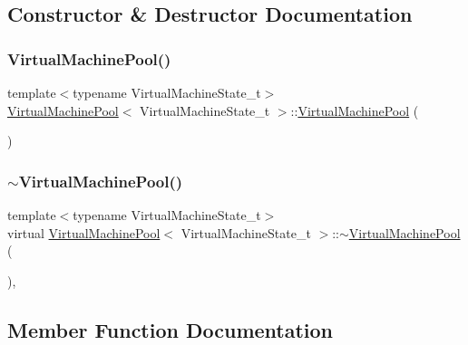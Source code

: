 \subsection{Constructor \& Destructor Documentation}
\mbox{\label{class_virtual_machine_pool_a52af5e2bd83f9f218535bc731fbfafdf}} 
\subsubsection{\texorpdfstring{Virtual\+Machine\+Pool()}{VirtualMachinePool()}}
{\footnotesize\ttfamily template$<$typename Virtual\+Machine\+State\+\_\+t$>$ \\
\hyperlink{class_virtual_machine_pool}{Virtual\+Machine\+Pool}$<$ Virtual\+Machine\+State\+\_\+t $>$\+::\hyperlink{class_virtual_machine_pool}{Virtual\+Machine\+Pool} (\begin{DoxyParamCaption}{ }\end{DoxyParamCaption})\hspace{0.3cm}{\ttfamily [inline]}}

\mbox{\label{class_virtual_machine_pool_ad28e85800bad5642776730c33f97795f}} 
\subsubsection{\texorpdfstring{$\sim$\+Virtual\+Machine\+Pool()}{~VirtualMachinePool()}}
{\footnotesize\ttfamily template$<$typename Virtual\+Machine\+State\+\_\+t$>$ \\
virtual \hyperlink{class_virtual_machine_pool}{Virtual\+Machine\+Pool}$<$ Virtual\+Machine\+State\+\_\+t $>$\+::$\sim$\hyperlink{class_virtual_machine_pool}{Virtual\+Machine\+Pool} (\begin{DoxyParamCaption}{ }\end{DoxyParamCaption})\hspace{0.3cm}{\ttfamily [inline]}, {\ttfamily [virtual]}}



\subsection{Member Function Documentation}
\mbox{\label{class_virtual_machine_pool_a1a514d25e69f45c8407f8d696861edd8}} 
